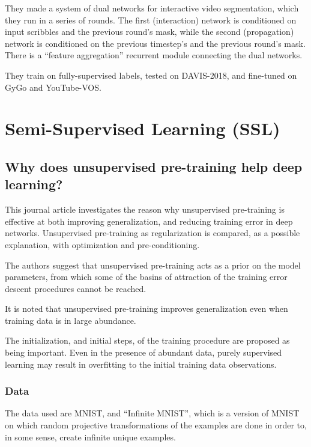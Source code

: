 \documentclass[a4paper, 12pt]{article}
\begin{document}
They made a system of dual networks for interactive video segmentation, which
they run in a series of rounds. The first (interaction) network is conditioned
on input scribbles and the previous round's mask, while the second
(propagation) network is conditioned on the previous timestep's and the
previous round's mask. There is a ``feature aggregation'' recurrent module
connecting the dual networks.

They train on fully-supervised labels, tested on DAVIS-2018, and fine-tuned on
GyGo and YouTube-VOS\@.


\section{Semi-Supervised Learning (SSL)}

\subsection{Why does unsupervised pre-training help deep
            learning?~\citet{Erhan:2010:WUP:1756006.1756025}}

This journal article investigates the reason why unsupervised pre-training is
effective at both improving generalization, and reducing training error in deep
networks. Unsupervised pre-training as regularization is compared, as a possible
explanation, with optimization and pre-conditioning.

The authors suggest that unsupervised pre-training acts as a prior on the model
parameters, from which some of the basins of attraction of the training error
descent procedures cannot be reached.

It is noted that unsupervised pre-training improves generalization even when
training data is in large abundance.

The initialization, and initial steps, of the training procedure are proposed
as being important. Even in the presence of abundant data, purely supervised
learning may result in overfitting to the initial training data observations.


\subsubsection{Data}

The data used are MNIST, and ``Infinite MNIST'', which is a version of MNIST on
which random projective transformations of the examples are done in order to,
in some sense, create infinite unique examples.
\end{document}
